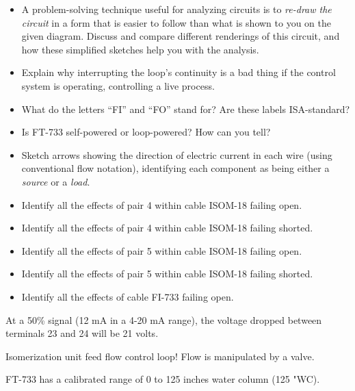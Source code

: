 \begin{itemize}
\item{} A problem-solving technique useful for analyzing circuits is to {\it re-draw the circuit} in a form that is easier to follow than what is shown to you on the given diagram.  Discuss and compare different renderings of this circuit, and how these simplified sketches help you with the analysis.
\item{} Explain why interrupting the loop's continuity is a bad thing if the control system is operating, controlling a live process.
\item{} What do the letters ``FI'' and ``FO'' stand for?  Are these labels ISA-standard?
\item{} Is FT-733 self-powered or loop-powered?  How can you tell?
\item{} Sketch arrows showing the direction of electric current in each wire (using conventional flow notation), identifying each component as being either a {\it source} or a {\it load}.
\item{} Identify all the effects of pair 4 within cable ISOM-18 failing open.
\item{} Identify all the effects of pair 4 within cable ISOM-18 failing shorted.
\item{} Identify all the effects of pair 5 within cable ISOM-18 failing open.
\item{} Identify all the effects of pair 5 within cable ISOM-18 failing shorted.
\item{} Identify all the effects of cable FI-733 failing open.
\end{itemize}







At a 50\% signal (12 mA in a 4-20 mA range), the voltage dropped between terminals 23 and 24 will be 21 volts.







Isomerization unit feed flow control loop!  Flow is manipulated by a valve.

\vskip 10pt

FT-733 has a calibrated range of 0 to 125 inches water column (125 "WC).

\vskip 10pt

